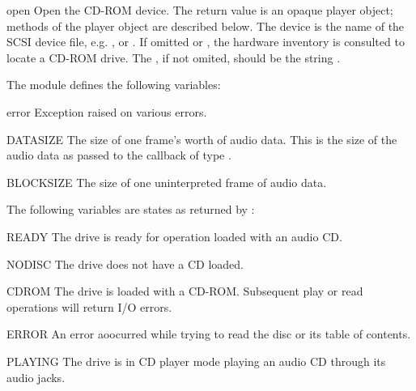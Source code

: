 \begin{funcdesc}{open}{}
Open the CD-ROM device.  The return value is an opaque player object;
methods of the player object are described below.  The device is the
name of the SCSI device file, e.g. , or
.  If omitted or , the hardware inventory is
consulted to locate a CD-ROM drive.  The , if not omited,
should be the string .
\end{funcdesc}

The module defines the following variables:

\begin{excdesc}{error}
Exception raised on various errors.
\end{excdesc}

\begin{datadesc}{DATASIZE}
The size of one frame's worth of audio data.  This is the size of the
audio data as passed to the callback of type .
\end{datadesc}

\begin{datadesc}{BLOCKSIZE}
The size of one uninterpreted frame of audio data.
\end{datadesc}

The following variables are states as returned by
:

\begin{datadesc}{READY}
The drive is ready for operation loaded with an audio CD.
\end{datadesc}

\begin{datadesc}{NODISC}
The drive does not have a CD loaded.
\end{datadesc}

\begin{datadesc}{CDROM}
The drive is loaded with a CD-ROM.  Subsequent play or read operations
will return I/O errors.
\end{datadesc}

\begin{datadesc}{ERROR}
An error aoocurred while trying to read the disc or its table of
contents.
\end{datadesc}

\begin{datadesc}{PLAYING}
The drive is in CD player mode playing an audio CD through its audio
jacks.
\end{datadesc}

